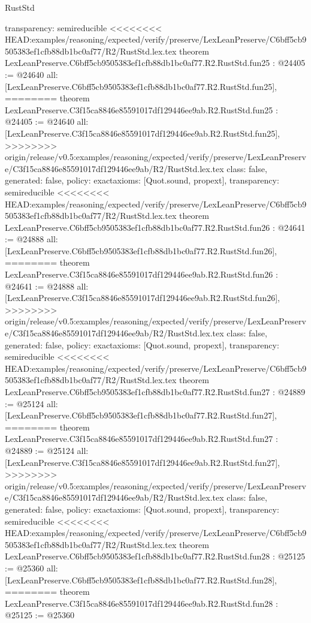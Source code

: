 \begin{lexlean}{RustStd}
\begin{coremodule}
{\begin{coremodule}
{{{{{{{{{{{{{{{{{{{{{{{{{{{{  transparency: semireducible
}
<<<<<<<< HEAD:examples/reasoning/expected/verify/preserve/LexLeanPreserve/C6bff5cb9505383ef1cfb88db1bc0af77/R2/RustStd.lex.tex
theorem LexLeanPreserve.C6bff5cb9505383ef1cfb88db1bc0af77.R2.RustStd.fun25 : @24405 := @24640 {
  all: [LexLeanPreserve.C6bff5cb9505383ef1cfb88db1bc0af77.R2.RustStd.fun25],
========
theorem LexLeanPreserve.C3f15ca8846e85591017df129446ee9ab.R2.RustStd.fun25 : @24405 := @24640 {
  all: [LexLeanPreserve.C3f15ca8846e85591017df129446ee9ab.R2.RustStd.fun25],
>>>>>>>> origin/release/v0.5:examples/reasoning/expected/verify/preserve/LexLeanPreserve/C3f15ca8846e85591017df129446ee9ab/R2/RustStd.lex.tex
  class: false,
  generated: false,
  policy: exact{axioms: [Quot.sound, propext]},
  transparency: semireducible
}
<<<<<<<< HEAD:examples/reasoning/expected/verify/preserve/LexLeanPreserve/C6bff5cb9505383ef1cfb88db1bc0af77/R2/RustStd.lex.tex
theorem LexLeanPreserve.C6bff5cb9505383ef1cfb88db1bc0af77.R2.RustStd.fun26 : @24641 := @24888 {
  all: [LexLeanPreserve.C6bff5cb9505383ef1cfb88db1bc0af77.R2.RustStd.fun26],
========
theorem LexLeanPreserve.C3f15ca8846e85591017df129446ee9ab.R2.RustStd.fun26 : @24641 := @24888 {
  all: [LexLeanPreserve.C3f15ca8846e85591017df129446ee9ab.R2.RustStd.fun26],
>>>>>>>> origin/release/v0.5:examples/reasoning/expected/verify/preserve/LexLeanPreserve/C3f15ca8846e85591017df129446ee9ab/R2/RustStd.lex.tex
  class: false,
  generated: false,
  policy: exact{axioms: [Quot.sound, propext]},
  transparency: semireducible
}
<<<<<<<< HEAD:examples/reasoning/expected/verify/preserve/LexLeanPreserve/C6bff5cb9505383ef1cfb88db1bc0af77/R2/RustStd.lex.tex
theorem LexLeanPreserve.C6bff5cb9505383ef1cfb88db1bc0af77.R2.RustStd.fun27 : @24889 := @25124 {
  all: [LexLeanPreserve.C6bff5cb9505383ef1cfb88db1bc0af77.R2.RustStd.fun27],
========
theorem LexLeanPreserve.C3f15ca8846e85591017df129446ee9ab.R2.RustStd.fun27 : @24889 := @25124 {
  all: [LexLeanPreserve.C3f15ca8846e85591017df129446ee9ab.R2.RustStd.fun27],
>>>>>>>> origin/release/v0.5:examples/reasoning/expected/verify/preserve/LexLeanPreserve/C3f15ca8846e85591017df129446ee9ab/R2/RustStd.lex.tex
  class: false,
  generated: false,
  policy: exact{axioms: [Quot.sound, propext]},
  transparency: semireducible
}
<<<<<<<< HEAD:examples/reasoning/expected/verify/preserve/LexLeanPreserve/C6bff5cb9505383ef1cfb88db1bc0af77/R2/RustStd.lex.tex
theorem LexLeanPreserve.C6bff5cb9505383ef1cfb88db1bc0af77.R2.RustStd.fun28 : @25125 := @25360 {
  all: [LexLeanPreserve.C6bff5cb9505383ef1cfb88db1bc0af77.R2.RustStd.fun28],
========
theorem LexLeanPreserve.C3f15ca8846e85591017df129446ee9ab.R2.RustStd.fun28 : @25125 := @25360 {
}}}}}}}}}}}}}}}}}}}}}}}}}}}}}}}}
\end{coremodule}}
\end{coremodule}
\end{lexlean}
